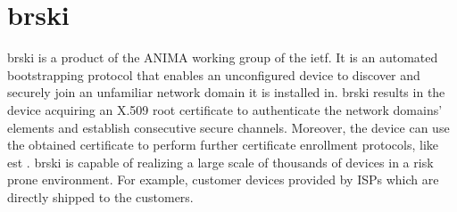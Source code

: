 \section{\acrfull*{brski}}
\gls{brski} is a product of the ANIMA working group of the \gls{ietf}. It is an automated bootstrapping protocol that enables an unconfigured device to discover and securely join an unfamiliar network domain it is installed in. \gls{brski} results in the device acquiring an X.509 root certificate to authenticate the network domains' elements and establish consecutive secure channels. Moreover, the device can use the obtained certificate to perform further certificate enrollment protocols, like \gls{est} \cite{rfc7030}. \gls{brski} is capable of realizing a large scale of thousands of devices in a risk prone environment. For example, customer devices provided by ISPs which are directly shipped to the customers.




